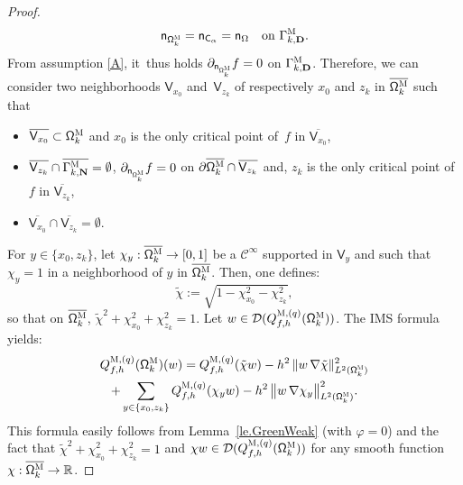 \documentclass[10pt]{amsart}
\newcommand{\mbf}[1]{\mathbf{#1}}
\let\pa\partial
\theoremstyle{plain}
\theoremstyle{definition}
\begin{document}
\begin{proof}
\begin{equation}\label{eq.=normaCalpha}
\mathsf n_{{\mathsf \Omega_k^{\textsc{M}}}}=\mathsf n_{ \mathsf C_\alpha}=\mathsf n_{ \Omega}\quad \text{on }\Gamma_{k,\mbf D}^{\textsc{M}}.
\end{equation}
From assumption \ref{A}, it~thus holds $\partial_{\mathsf n_{ \mathsf \Omega_k^{\textsc{M}}}}f=0$ on $\Gamma_{k,\mbf D}^{\textsc{M}}$.
Therefore, we can consider two neighborhoods $\mathsf V_{x_0}$ and~$\mathsf V_{z_k}$ of respectively $x_0$ and $z_k$ in $\overline {\mathsf \Omega_k^{\textsc{M}}}$ such that
\begin{itemize}
\item
$\overline{\mathsf V_{x_0}}\subset {\mathsf \Omega_k^{\textsc{M}}}$ and $x_0$ is the only critical point of~$f$ in $\overline{\mathsf V_{x_0}}$,
\item
$\overline {\mathsf V_{z_k}} \cap \overline{\Gamma_{k,\mbf N}^{\textsc{M}}}=\emptyset$, $ \partial_{\mathsf n_{ \mathsf \Omega_k^{\textsc{M}}}}f=0$ on $\pa\overline {\mathsf \Omega_k^{\textsc{M}}} \cap\overline {\mathsf V_{z_k}}$
and, $z_k$ is the only critical point of~$f$ in $\overline {\mathsf V_{z_k}}$,
\item
$\overline{\mathsf V_{x_0}}\cap \overline {\mathsf V_{z_k}}=\emptyset$.
\end{itemize}
For $y\in \{x_0,z_k\}$, let $\chi_y: \overline {\mathsf \Omega_k^{\textsc{M}}}\to [0,1]$ be a $\mathcal C^\infty$ supported in $\mathsf V_y$ and such that $\chi_y=1$ in a neighborhood of $y$ in $\overline {\mathsf \Omega_k^{\textsc{M}}}$.
Then, one defines:\vspace*{-3pt}
\[
\tilde \chi:=\sqrt{1- \chi_{x_0}^2-\chi_{z_k}^2},
\]
so that on $\overline {\mathsf \Omega_k^{\textsc{M}}}$, $\tilde \chi^2+\chi_{x_0}^2+\chi_{z_k}^2=1$.
Let $w\in \mathcal D(Q_{f,h}^{\textsc{M},(q)}(\mathsf \Omega_k^{\textsc{M}}))$.
The IMS formula~\cite{CFKS,helffer-nier-06} yields:\vspace*{-5pt}
\begin{multline*}
Q_{f,h}^{\textsc{M},(q)}(\mathsf \Omega_k^{\textsc{M}})(w) = Q_{f,h}^{\textsc{M},(q)}(\tilde \chi w) - h^2\, \Vert w\, \nabla \tilde \chi \Vert_{L^2(\mathsf \Omega_k^{\textsc{M}})}^2\\
+ \sum_{y\in \{x_0,z_k\}} Q_{f,h}^{\textsc{M},(q)}(\chi_y w) - h^2\,\big \Vert w\, \nabla \chi_y \big \Vert_{L^2(\mathsf \Omega_k^{\textsc{M}})}^2.
\end{multline*}
This formula easily follows from Lemma~\ref{le.GreenWeak} (with $\varphi=0$) and the fact that $\tilde \chi^2+\chi_{x_0}^2+\chi_{z_k}^2=1$ and $\chi w\in \mathcal D(Q_{f,h}^{\textsc{M},(q)}(\mathsf \Omega_k^{\textsc{M}}))$ for any smooth function $\chi:\overline {\mathsf \Omega_k^{\textsc{M}}}\to \mathbb R$.


\end{proof}
\end{document}
